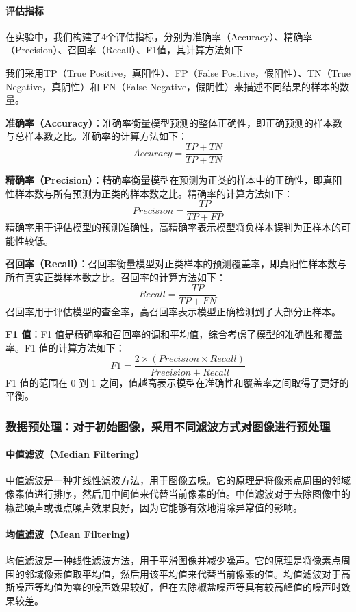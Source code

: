 \documentclass[12pt,hyperref,a4paper,UTF8]{ctexart}
\begin{document}
\paragraph{评估指标}
在实验中，我们构建了4个评估指标，分别为准确率（Accuracy）、精确率（Precision）、召回率（Recall）、F1值，其计算方法如下
\par
我们采用TP（True Positive，真阳性）、FP（False Positive，假阳性）、TN（True Negative，真阴性）和 FN（False Negative，假阴性）来描述不同结果的样本的数量。
\par
\textbf{准确率（Accuracy）}：准确率衡量模型预测的整体正确性，即正确预测的样本数与总样本数之比。准确率的计算方法如下：
$$
Accuracy = \frac{TP + TN}{TP + TN}
$$
\par
\textbf{精确率（Precision）}：精确率衡量模型在预测为正类的样本中的正确性，即真阳性样本数与所有预测为正类的样本数之比。精确率的计算方法如下：
$$
Precision = \frac{TP}{TP + FP}
$$
精确率用于评估模型的预测准确性，高精确率表示模型将负样本误判为正样本的可能性较低。
\par
\textbf{召回率（Recall）}：召回率衡量模型对正类样本的预测覆盖率，即真阳性样本数与所有真实正类样本数之比。召回率的计算方法如下：
$$
Recall = \frac{TP}{TP + FN}
$$
召回率用于评估模型的查全率，高召回率表示模型正确检测到了大部分正样本。
\par
\textbf{F1 值}：F1 值是精确率和召回率的调和平均值，综合考虑了模型的准确性和覆盖率。F1 值的计算方法如下：
$$
F1= \frac{2 \times (Precision \times Recall)}{Precision + Recall}
$$
F1 值的范围在 0 到 1 之间，值越高表示模型在准确性和覆盖率之间取得了更好的平衡。

\subsubsection{数据预处理：对于初始图像，采用不同滤波方式对图像进行预处理}
\paragraph{中值滤波（Median Filtering）}
中值滤波是一种非线性滤波方法，用于图像去噪。它的原理是将像素点周围的邻域像素值进行排序，然后用中间值来代替当前像素的值。中值滤波对于去除图像中的椒盐噪声或斑点噪声效果良好，因为它能够有效地消除异常值的影响。
\paragraph{均值滤波（Mean Filtering）}
均值滤波是一种线性滤波方法，用于平滑图像并减少噪声。它的原理是将像素点周围的邻域像素值取平均值，然后用该平均值来代替当前像素的值。均值滤波对于高斯噪声等均值为零的噪声效果较好，但在去除椒盐噪声等具有较高峰值的噪声时效果较差。
\end{document}
